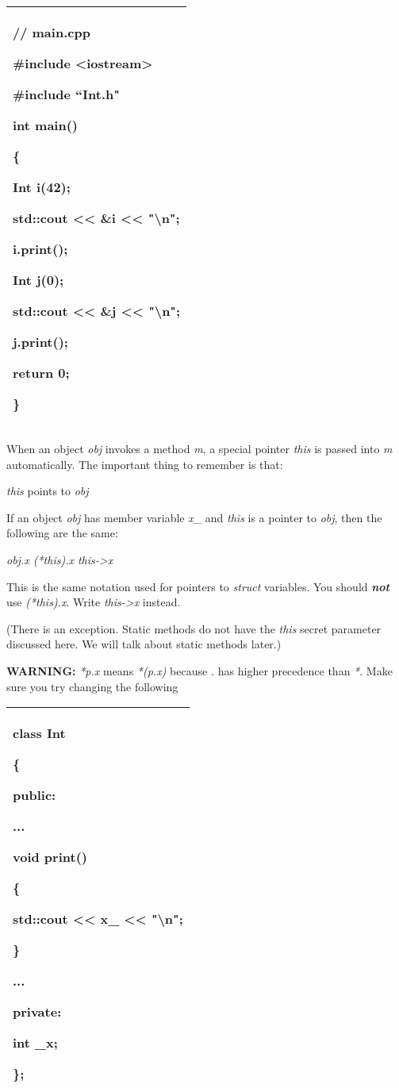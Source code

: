 \documentclass[
]{article}
\begin{document}
\begin{longtable}[]{@{}l@{}}
\toprule
\endhead
\begin{minipage}[t]{0.97\columnwidth}\raggedright
// main.cpp

\#include \textless iostream\textgreater{}

\#include ``Int.h"

int main()

\{

Int i(42);

std::cout \textless\textless{} \&i \textless\textless{}
"\textbackslash n";

i.print();

Int j(0);

std::cout \textless\textless{} \&j \textless\textless{}
"\textbackslash n";

j.print();

return 0;

\}\strut
\end{minipage}\tabularnewline
\bottomrule
\end{longtable}

When an object \emph{obj} invokes a method \emph{m}, a special pointer
\emph{this} is passed into \emph{m} automatically. The important thing
to remember is that:

\emph{this} points to \emph{obj}

If an object \emph{obj} has member variable \emph{x\_} and \emph{this}
is a pointer to \emph{obj}, then the following are the same:

\emph{obj.x (*this).x this-\textgreater x}

This is the same notation used for pointers to \emph{struct} variables.
You should \emph{\textbf{not}} use \emph{(*this).x}. Write
\emph{this-\textgreater x} instead.

(There is an exception. Static methods do not have the \emph{this}
secret parameter discussed here. We will talk about static methods
later.)

\textbf{WARNING:} \emph{*p.x} means \emph{*(p.x)} because \emph{.} has
higher precedence than \emph{*}. Make sure you try changing the
following

\begin{longtable}[]{@{}l@{}}
\toprule
\endhead
\begin{minipage}[t]{0.97\columnwidth}\raggedright
class Int

\{

public:

...

void print()

\{

std::cout \textless\textless{} \textbf{x\_} \textless\textless{}
"\textbackslash n";

\}

...

private:

int \_x;

\};\strut
\end{minipage}\tabularnewline
\bottomrule
\end{longtable}
\end{document}
